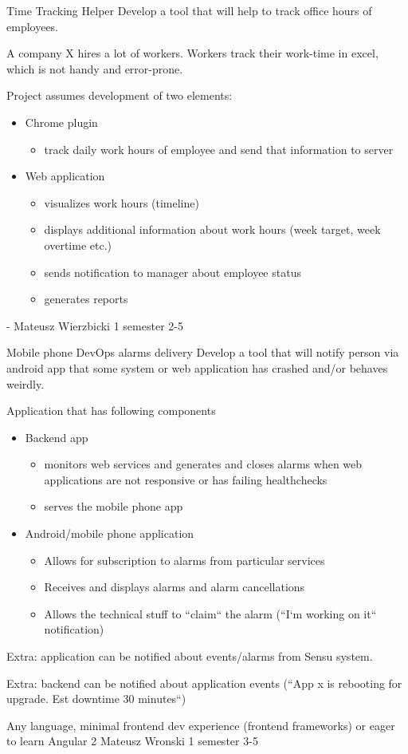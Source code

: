 \begin{project}
{Time Tracking Helper}
{Develop a tool that will help to track office hours of employees.} 
{ 
A company X hires a lot of workers. Workers track their work-time in excel, which is not handy and error-prone.

Project assumes development of two elements:
\begin{itemize}
	\item Chrome plugin
		\begin{itemize}
			\item track daily work hours of employee and send that information to server
		\end{itemize}
	\item Web application
		\begin{itemize}
			\item visualizes work hours (timeline)
			\item displays additional information about work hours (week target, week overtime etc.)
			\item sends notification to manager about employee status
			\item generates reports
		\end{itemize}
\end{itemize}
}
{-}
{Mateusz Wierzbicki}
{1 semester}
{2-5}
\end{project}
\begin{project}
{Mobile phone DevOps alarms delivery}
{Develop a tool that will notify person via android app that some system or web application has crashed and/or behaves weirdly.} 
{
Application that has following components
\begin{itemize}
	\item Backend app
		\begin{itemize}
			\item monitors web services and generates and closes alarms when web applications are not responsive or has failing healthchecks
			\item serves the mobile phone app
		\end{itemize}
	\item Android/mobile phone application
		\begin{itemize}
			\item Allows for subscription to alarms from particular services
			\item Receives and displays alarms and alarm cancellations
			\item Allows the technical stuff to ``claim`` the alarm (``I`m working on it`` notification)
		\end{itemize}
\end{itemize}
Extra: application can be notified about events/alarms from Sensu system.

Extra: backend can be notified about application events (``App x is rebooting for upgrade. Est downtime 30 minutes``)
}
{Any language, minimal frontend dev experience (frontend frameworks) or eager to learn Angular 2}
{Mateusz Wronski}
{1 semester}
{3-5}
\end{project}
